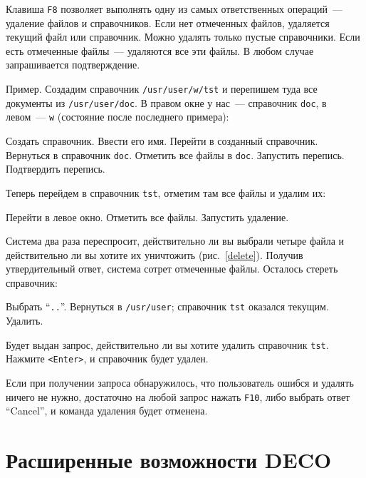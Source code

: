 Клавиша {\tt F8} позволяет выполнять одну из самых
ответственных операций~--- удаление файлов и справочников.
Если нет отмеченных файлов, удаляется текущий файл или
справочник. Можно удалять только пустые справочники.
Если есть отмеченные файлы~--- удаляются все эти файлы.
В любом случае запрашивается подтверждение.

Пример. Создадим справочник {\tt /usr/user/w/tst} и перепишем туда
все документы из {\tt /usr/user/doc}. В правом окне у нас~--- справочник
{\tt doc}, в левом~--- {\tt w} (состояние после последнего примера):

\begin{example}
Создать справочник.
Ввести его имя.
Перейти в созданный справочник.
Вернуться в справочник {\tt doc}.
Отметить все файлы в {\tt doc}.
Запустить перепись.
Подтвердить перепись.
\end{example}

Теперь перейдем в справочник {\tt tst}, отметим там все
файлы и удалим их:

\begin{example}
Перейти в левое окно.
Отметить все файлы.
Запустить удаление.
\end{example}


Система два раза переспросит, действительно ли вы выбрали четыре
файла и действительно ли вы хотите их уничтожить (рис.~\ref{delete}).
Получив утвердительный ответ, система сотрет
отмеченные файлы. Осталось стереть справочник:

\begin{example}
Выбрать ``{\tt ..}''.
Вернуться в {\tt /usr/user}; справочник {\tt tst} оказался текущим.
Удалить.
\end{example}

Будет выдан запрос, действительно ли вы хотите удалить
справочник {\tt tst}. Нажмите {\tt <Enter>}, и справочник будет удален.

Если при получении запроса обнаружилось, что
пользователь ошибся и удалять ничего не нужно, достаточно на любой
запрос нажать {\tt F10}, либо выбрать ответ ``Cancel'',
и команда удаления будет отменена.

\section{Расширенные возможности DECO}

